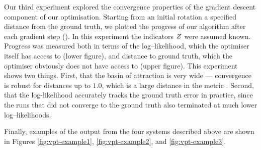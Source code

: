 Our third experiment explored the convergence properties of the
gradient descent component of our optimisation. Starting from an
initial rotation a specified distance from the ground truth, we
plotted the progress of our algorithm after each gradient step
(). In this experiment the indicators
$\Indicators$ were assumed known. Progress was measured both in terms
of the log--likelihood, which the optimiser itself has access to
(lower figure), and distance to ground truth, which the optimiser
obviously does not have access to (upper figure). This experiment
shows two things. First, that the basin of attraction is very wide ---
convergence is robust for distances up to $1.0$, which is a large
distance in the metric . Second, that the
log-likelihood accurately tracks the ground truth error in practice,
since the runs that did not converge to the ground truth also
terminated at much lower log--likelihoods.

Finally, examples of the output from the four systems described above
are shown in Figures \ref{fig:vpt-example1}, \ref{fig:vpt-example2},
and \ref{fig:vpt-example3}.



